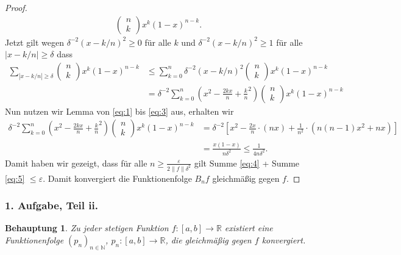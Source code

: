 \documentclass[draft,a5paper]{article}
\newtheorem*{beh}{Behauptung}
\begin{document}
\begin{proof}
\begin{align*}
    {\begin{pmatrix} n \\ k \end{pmatrix} x^k (1-x)^{n-k}}.
  \end{align*}
  Jetzt gilt wegen \(\delta^{-2}(x - k/n)^2 \ge 0\) für alle \(k\) und
  \(\delta^{-2}(x - k/n)^2 \ge 1\) für alle \(|x - k/n| \ge \delta\) dass
  \begin{align*}
    \sum_{|x - k/n| \ge \delta}
    {\begin{pmatrix} n \\ k \end{pmatrix} x^k (1-x)^{n-k}}
    &\le \sum_{k = 0}^{n} \delta^{-2}(x - k/n)^2
      {\begin{pmatrix} n \\ k \end{pmatrix} x^k (1-x)^{n-k}} \\
    &= \delta^{-2} \sum_{k = 0}^{n}
      \left( x^2 - \frac{2kx}{n} + \frac{k}{n}^2 \right)
      {\begin{pmatrix} n \\ k \end{pmatrix} x^k (1-x)^{n-k}}
  \end{align*}
  Nun nutzen wir Lemma von \eqref{eq:1} bis \eqref{eq:3} aus, erhalten wir
  \begin{align*}
    \delta^{-2} \sum_{k = 0}^{n}
    \left( x^2 - \frac{2kx}{n} + \frac{k}{n}^2 \right)
    {\begin{pmatrix} n \\ k \end{pmatrix} x^k (1-x)^{n-k}}
    &= \delta^{-2} \left[ x^2 - \frac{2x}{n} \cdot (nx) + \frac{1}{n^2}
      \cdot (n(n-1)x^2 + nx) \right]\\
    &= \frac{x(1-x)}{n\delta^2} \le \frac{1}{4n\delta^2}.
  \end{align*}
  Damit haben wir gezeigt, dass für alle
  \(n \ge \frac{\varepsilon}{2 \|f\| \delta^2}\) gilt Summe \eqref{eq:4} +
  Summe \eqref{eq:5} \(\le \varepsilon\).  Damit konvergiert die
  Funktionenfolge \(B_n f\) gleichmäßig gegen \(f\).
\end{proof}

\subsubsection*{1. Aufgabe, Teil ii.}

\begin{beh}
  Zu jeder stetigen Funktion \(f \colon [a, b] \to \mathbb{R}\) existiert
  eine Funktionenfolge \((p_n)_{n \in \mathbb{N}}\), $p_n \colon [a, b] \to
  \mathbb{R}$, die gleichmäßig gegen \(f\) konvergiert.
\end{beh}
\end{document}
